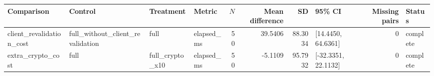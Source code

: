 \begin{tabular}{llllrrrlrl}
Comparison & Control & Treatment & Metric & $N$ & Mean difference & SD & 95\% CI & Missing pairs & Status \\
\hline
client\_revalidation\_cost & full\_without\_client\_revalidation & full & elapsed\_ms & 50 & 39.5406 & 88.3034 & [14.4450, 64.6361] & 0 & complete \\
extra\_crypto\_cost & full & full\_crypto\_x10 & elapsed\_ms & 50 & -5.1109 & 95.7932 & [-32.3351, 22.1132] & 0 & complete \\
\end{tabular}
